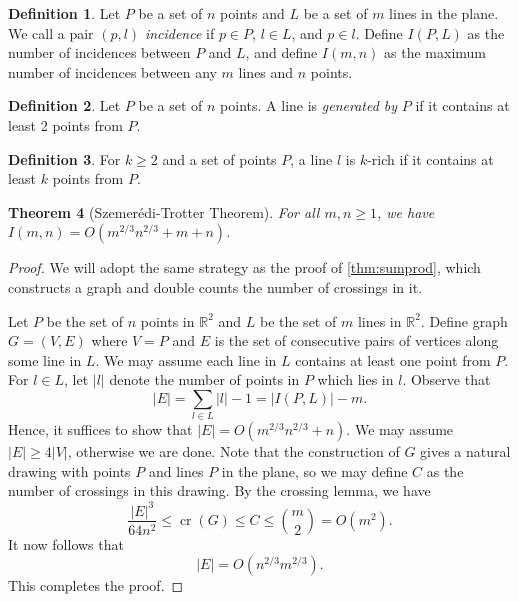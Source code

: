 \documentclass[12pt,reqno]{amsart}
\newtheorem{theorem}{Theorem}[section]
\theoremstyle{definition}
\newtheorem{definition}[theorem]{Definition}
\theoremstyle{remark}
\renewcommand{\leq}{\leqslant}
\renewcommand{\geq}{\geqslant}
\def\R{\mathbb{R}}
\def\cr{\operatorname{cr}}
\numberwithin{equation}{section}
\begin{document}
\begin{definition}
	Let $P$ be a set of $n$ points and $L$ be a set of $m$ lines in the plane. We call a pair $(p, l)$ \textit{incidence} if $p \in P$, $l \in L$, and $p \in l$. Define $I(P, L)$ as the number of incidences between $P$ and $L$, and define $I(m, n)$ as the maximum number of incidences between any $m$ lines and $n$ points.
\end{definition}

\begin{definition}
	Let $P$ be a set of $n$ points. A line is \textit{generated by} $P$ if it contains at least 2 points from $P$.
\end{definition}

\begin{definition}
	For $k \geq 2$ and a set of points $P$, a line $l$ is $k$-rich if it contains at least $k$ points from $P$.
\end{definition}

\begin{theorem}[Szemerédi-Trotter Theorem]\label{thm:szemeredi-trotter}
	For all $m, n \geq 1$, we have $I(m, n) = O(m^{2/3}n^{2/3} + m + n)$.
\end{theorem}

\begin{proof}
	We will adopt the same strategy as the proof of \cref{thm:sumprod}, which constructs a graph and double counts the number of crossings in it.

	Let $P$ be the set of $n$ points in $\R^2$ and $L$ be the set of $m$ lines in $\R^2$.	Define graph $G = (V, E)$ where $V = P$ and $E$ is the set of consecutive pairs of vertices along some line in $L$. We may assume each line in $L$ contains at least one point from $P$. For $l \in L$, let $|l|$ denote the number of points in $P$ which lies in $l$. Observe that
	\[
		|E| = \sum_{l \in L} |l| - 1 = |I(P, L)| - m.
	\]
	Hence, it suffices to show that $|E| = O(m^{2/3}n^{2/3} + n)$. We may assume $|E| \geq 4|V|$, otherwise we are done. Note that the construction of $G$ gives a natural drawing with points $P$ and lines $P$ in the plane, so we may define $C$ as the number of crossings in this drawing. By the crossing lemma, we have
	\[
		\frac{|E|^3}{64n^2} \leq \cr(G) \leq C \leq \binom{m}{2} = O(m^2).
	\]
	It now follows that
	\[
		|E| = O(n^{2/3}m^{2/3}).
	\]
	This completes the proof.
\end{proof}

\end{document}
